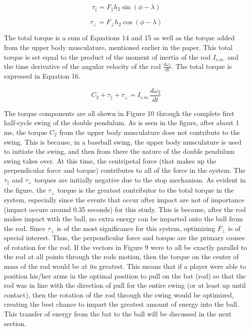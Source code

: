 \documentclass[%
 aip,
 amsmath,amssymb,
 reprint,%
 floatfix,%
]{revtex4-1}
\begin{document}
\begin{equation}
	\tau_{\parallel} = F_{\parallel} h_2 \sin{(\phi - \lambda)}
\end{equation}

\begin{equation}
	\tau_{\perp} = F_{\perp} h_2 \cos{(\phi - \lambda)}
\end{equation}

The total torque is a sum of Equations 14 and 15 as well as the torque added from the upper body musculature, mentioned earlier in the paper. This total torque is set equal to the product of the moment of inertia of the rod $I_{c.m.}$ and the time derivative of the angular velocity of the rod $\frac{d\omega_2}{dt}$. The total torque is expressed in Equation 16.

\begin{equation}
	C_2 + \tau_{\parallel} + \tau_{\perp} = I_{c.m.} \frac{d \omega_2}{dt}
\end{equation}

The torque components are all shown in Figure 10 through the complete first half-cycle swing of the double pendulum. As is seen in the figure, after about 1 ms, the torque $C_2$ from the upper body musculature does not contribute to the swing. This is because, in a baseball swing, the upper body musculature is used to initiate the swing, and then from there the nature of the double pendulum swing takes over. At this time, the centripetal force (that makes up the perpendicular force and torque) contributes to all of the force in the system. The $\tau_{\parallel}$ and $\tau_{\perp}$ torques are initially negative due to the stop mechanism. As evident in the figure, the $\tau_{\perp}$ torque is the greatest contributor to the total torque in the system, especially since the events that occur after impact are not of importance (impact occurs around 0.35 seconds) for this study. This is because, after the rod makes impact with the ball, no extra energy can be imparted onto the ball from the rod. Since $\tau_{\perp}$ is of the most significance for this system, optimizing $F_{\perp}$ is of special interest. Thus, the perpendicular force and torque are the primary causes of rotation for the rod. If the vectors in Figure 9 were to all be exactly parallel to the rod at all points through the rods motion, then the torque on the center of mass of the rod would be at its greatest. This means that if a player were able to position his/her arms in the optimal position to pull on the bat (rod) so that the rod was in line with the direction of pull for the entire swing (or at least up until contact), then the rotation of the rod through the swing would be optimized, creating the best chance to impart the greatest amount of energy into the ball. This transfer of energy from the bat to the ball will be discussed in the next section.
\end{document}
